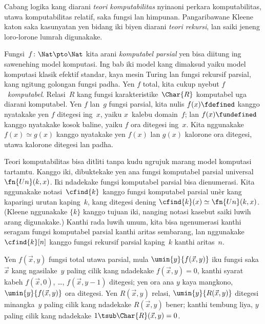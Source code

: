 \documentclass[../../../include/open-logic-section]{subfiles}
\begin{document}

Cabang logika kang diarani \emph{teori komputabilitas}
nyinaoni perkara komputabilitas, utawa komputabilitas
relatif, saka fungsi lan himpunan. Pangaribawane
Kleene katon saka kasunyatan yen bidang iki biyen
diarani \emph{teori rekursi}, lan saiki jeneng loro-lorone
lumrah digunakake.

Fungsi~$f\colon \Nat \pto \Nat$ kita arani
\emph{komputabel parsial} yen bisa diitung ing
sawenehing model komputasi. Ing bab iki model kang dimaksud yaiku model komputasi klasik efektif standar, kaya mesin Turing lan fungsi rekursif parsial, kang ngitung golongan fungsi padha. Yen $f$ total, kita
cukup nyebut $f$~\emph{komputabel}. Relasi~$R$
kang fungsi karakteristike~$\Char{R}$ komputabel
uga diarani komputabel. Yen $f$ lan~$g$ fungsi
parsial, kita nulis $f(x) \fdefined$ kanggo
nyatakake yen $f$ ditegesi ing~$x$, yaiku
$x$~kalebu domain~$f$; lan $f(x) \fundefined$
kanggo nyatakake kosok baline, yaiku $f$
ora ditegesi ing~$x$. Kita nggunakake
$f(x) \simeq g(x)$ kanggo nyatakake yen
$f(x)$ lan $g(x)$ kalorone ora ditegesi,
utawa kalorone ditegesi lan padha.

Teori komputabilitas bisa ditliti tanpa kudu
ngrujuk marang model komputasi tartamtu.
Kanggo iki, dibuktekake yen ana fungsi
komputabel parsial universal~$\fn{Un}(k, x)$.
Iki ndadekake fungsi komputabel parsial bisa
dienumerasi. Kita nggunakake notasi~$\cfind{k}$
kanggo fungsi komputabel parsial unèr kang
kaparingi urutan kaping~$k$, kang ditegesi
dening $\cfind{k}(x) \simeq \fn{Un}(k, x)$.
(Kleene nggunakake $\{ k \}$ kanggo tujuan
iki, nanging notasi kasebut saiki luwih
arang digunakake.) Kanthi rada luwih umum,
kita bisa ngenumerasi kanthi seragam fungsi
komputabel parsial kanthi aritas sembarang,
lan nggunakake $\cfind{k}[n]$ kanggo fungsi
rekursif parsial kaping~$k$ kanthi aritas~$n$.

Yen $f(\vec x, y)$ fungsi total utawa parsial,
mula $\umin{y}{f
(\vec x, y)}$ iku fungsi saka~$\vec x$ kang
ngasilake~$y$ paling cilik kang ndadekake
$f(\vec x, y) = 0$, kanthi syarat kabeh
$f(\vec x, 0)$, \dots, $f(\vec x, y-1)$
ditegesi; yen ora ana $y$ kaya mangkono,
$\umin{y}{f (\vec x, y)}$ ora ditegesi.
Yen $R(\vec x, y)$ relasi, $\umin{y}{R(\vec x, y)}$
ditegesi minangka~$y$ paling cilik kang
ndadekake $R(\vec x, y)$ bener; kanthi
tembung liya, $y$ paling cilik kang
ndadekake $1 \tsub \Char{R}(\vec x, y) = 0$.
\end{document}
